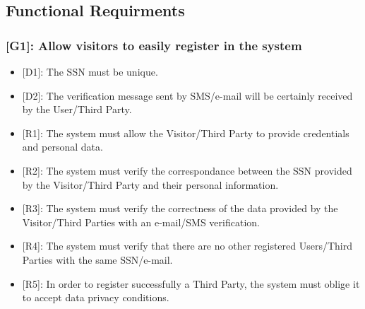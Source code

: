\documentclass[12pt,a4paper]{article}
\begin{document}
    \newpage
   
	\subsection{Functional Requirments}
	\subsubsection*{{[}{G1}{]}: Allow visitors to easily register in the system}
	\begin{itemize}
			\begin{itemize}
					\item {[D1]}: The SSN must be unique.
					\item {[D2]}: The verification message sent by SMS/e-mail will be certainly received by the User/Third Party.
					\\
					\item {[R1]}: The system must allow the Visitor/Third Party to provide credentials and personal data.
					\item {[R2]}: The system must verify the correspondance between the SSN provided by the Visitor/Third Party and their personal information.
					\item {[R3]}: The system must verify the correctness of the data provided by the Visitor/Third Parties with an e-mail/SMS verification.
					\item {[R4]}: The system must verify that there are no other registered Users/Third Parties with the same SSN/e-mail.
					\item {[R5]}: In order to register successfully a Third Party, the system must oblige it to accept data privacy conditions.
			\end{itemize} 
	\end{itemize}
\end{document}
